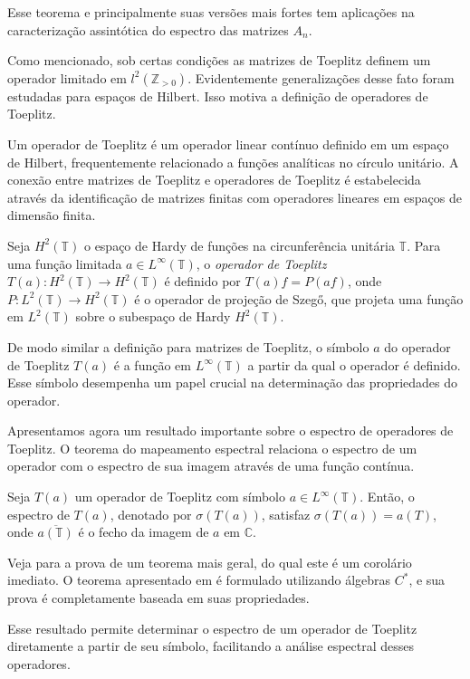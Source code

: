 Esse teorema e principalmente suas versões mais fortes tem aplicações na caracterização assintótica do espectro das matrizes $A_n$.

Como mencionado, sob certas condições as matrizes de Toeplitz definem um operador limitado em $l^2(\mathbb{Z}_{> 0})$. Evidentemente generalizações desse fato foram estudadas para espaços de Hilbert. Isso motiva a definição de operadores de Toeplitz.

Um operador de Toeplitz é um operador linear contínuo definido em um espaço de Hilbert, frequentemente relacionado a funções analíticas no círculo unitário. A conexão entre matrizes de Toeplitz e operadores de Toeplitz é estabelecida através da identificação de matrizes finitas com operadores lineares em espaços de dimensão finita.
\begin{definition*}
  Seja $H^2(\mathbb{T})$ o espaço de Hardy de funções na circunferência unitária $\mathbb{T}$. Para uma função limitada $a \in L^\infty(\mathbb{T})$, o \textit{operador de Toeplitz} $T(a) : H^2(\mathbb{T}) \to H^2(\mathbb{T})$ é definido por $T(a)f=P(af)$, onde $P : L^2(\mathbb{T}) \to H^2(\mathbb{T})$ é o operador de projeção de Szegő, que projeta uma função em $L^2(\mathbb{T})$ sobre o subespaço de Hardy $H^2(\mathbb{T})$.
\end{definition*}
De modo similar a definição para matrizes de Toeplitz, o símbolo $a$ do operador de Toeplitz $T(a)$ é a função em $L^\infty(\mathbb{T})$ a partir da qual o operador é definido. Esse símbolo desempenha um papel crucial na determinação das propriedades do operador.

Apresentamos agora um resultado importante sobre o espectro de operadores de Toeplitz. O teorema do mapeamento espectral relaciona o espectro de um operador com o espectro de sua imagem através de uma função contínua.
\begin{theorem*}
  Seja $T(a)$ um operador de Toeplitz com símbolo $a \in L^\infty(\mathbb{T})$. Então, o espectro de $T(a)$, denotado por $\sigma(T(a))$, satisfaz $\sigma(T(a))=a(T)$, onde $\overline{a(\mathbb{T})}$ é o fecho da imagem de $a$ em $\mathbb{C}$.
\end{theorem*}

Veja \cite[p. 85]{Douglas1998} para a prova de um teorema mais geral, do qual este é um corolário imediato. O teorema apresentado em \cite{Douglas1998} é formulado utilizando álgebras $C^\ast$, e sua prova é completamente baseada em suas propriedades.

Esse resultado permite determinar o espectro de um operador de Toeplitz diretamente a partir de seu símbolo, facilitando a análise espectral desses operadores.


